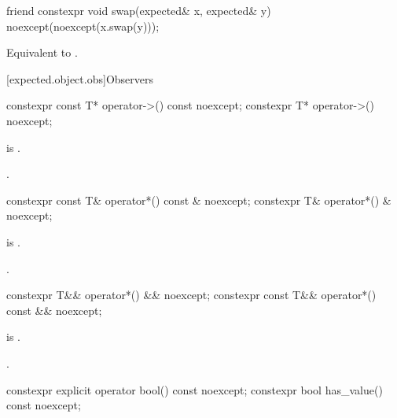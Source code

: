 %
\begin{itemdecl}
friend constexpr void swap(expected& x, expected& y) noexcept(noexcept(x.swap(y)));
\end{itemdecl}

\begin{itemdescr}
\pnum
\effects
Equivalent to .
\end{itemdescr}

[expected.object.obs]{Observers}

%
\begin{itemdecl}
constexpr const T* operator->() const noexcept;
constexpr T* operator->() noexcept;
\end{itemdecl}

\begin{itemdescr}
\pnum
\expects
{} is .

\pnum
\returns
{}.
\end{itemdescr}

%
\begin{itemdecl}
constexpr const T& operator*() const & noexcept;
constexpr T& operator*() & noexcept;
\end{itemdecl}

\begin{itemdescr}
\pnum
\expects
{} is .

\pnum
\returns
{}.
\end{itemdescr}

%
\begin{itemdecl}
constexpr T&& operator*() && noexcept;
constexpr const T&& operator*() const && noexcept;
\end{itemdecl}

\begin{itemdescr}
\pnum
\expects
{} is .

\pnum
\returns
{}.
\end{itemdescr}

%
%
\begin{itemdecl}
constexpr explicit operator bool() const noexcept;
constexpr bool has_value() const noexcept;
\end{itemdecl}

